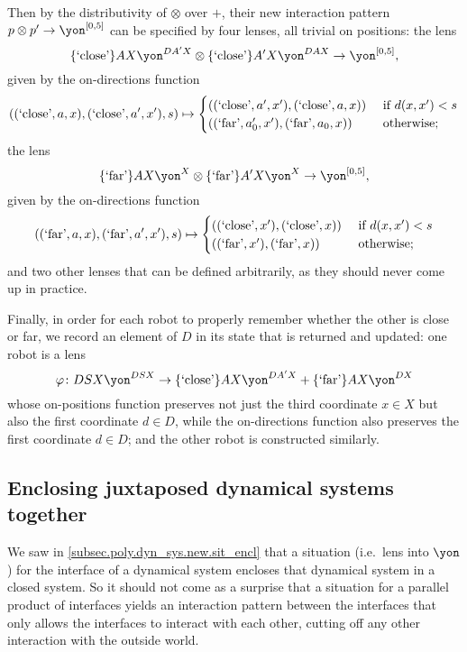 \documentclass[Book-Poly]{subfiles}
\begin{document}
\begin{exercise}
\begin{solution}
\begin{enumerate}
    Then by the distributivity of $\otimes$ over $+$, their new interaction pattern $p\otimes p'\to\yon^{[0,5]}$ can be specified by four lenses, all trivial on positions: the lens
    \[
        \{\text{`close'}\}AX\yon^{DA'X}\otimes\{\text{`close'}\}A'X\yon^{DAX}\to\yon^{[0,5]},
    \]
    given by the on-directions function
    \[
        ((\text{`close'},a,x),(\text{`close'},a',x'),s)\mapsto
          \begin{cases}
          	((\text{`close'},a',x'),(\text{`close'},a,x))&\textnormal{ if }d(x,x')<s\\
          	((\text{`far'},a'_0,x'),(\text{`far'},a_0,x))&\textnormal{ otherwise};
          \end{cases}
    \]
    the lens
    \[
        \{\text{`far'}\}AX\yon^X\otimes\{\text{`far'}\}A'X\yon^X\to\yon^{[0,5]},
    \]
    given by the on-directions function
    \[
        ((\text{`far'},a,x),(\text{`far'},a',x'),s)\mapsto
          \begin{cases}
          	((\text{`close'},x'),(\text{`close'},x))&\textnormal{ if }d(x,x')<s\\
          	((\text{`far'},x'),(\text{`far'},x))&\textnormal{ otherwise};
          \end{cases}
    \]
    and two other lenses that can be defined arbitrarily, as they should never come up in practice.
    
    Finally, in order for each robot to properly remember whether the other is close or far, we record an element of $D$ in its state that is returned and updated: one robot is a lens
    \[
        \varphi\colon DSX\yon^{DSX}\to \{\text{`close'}\}AX\yon^{DA'X}+\{\text{`far'}\}AX\yon^{DX}
    \]
    whose on-positions function preserves not just the third coordinate $x\in X$ but also the first coordinate $d\in D$, while the on-directions function also preserves the first coordinate $d\in D$; and the other robot is constructed similarly.
\end{enumerate}
\end{solution}
\end{exercise}

\subsection{Enclosing juxtaposed dynamical systems together}

We saw in \cref{subsec.poly.dyn_sys.new.sit_encl} that a situation (i.e.\ lens into $\yon$) for the interface of a dynamical system encloses that dynamical system in a closed system.
So it should not come as a surprise that a situation for a parallel product of interfaces yields an interaction pattern between the interfaces that only allows the interfaces to interact with each other, cutting off any other interaction with the outside world.
\end{document}
